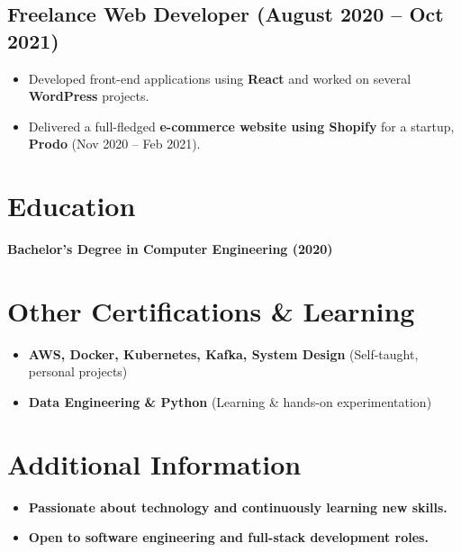 \documentclass[a4paper,11pt]{article}
\begin{document}
{\subsection*{Freelance Web Developer (August 2020 – Oct 2021)}
\begin{itemize}
    \item Developed front-end applications using \textbf{React} and worked on several \textbf{WordPress} projects.
    \item Delivered a full-fledged \textbf{e-commerce website using Shopify} for a startup, \textbf{Prodo} (Nov 2020 – Feb 2021).
\end{itemize}

\section*{{\faGraduationCap} Education}
\textbf{Bachelor's Degree in Computer Engineering (2020)}

\section*{{\faBook} Other Certifications \& Learning}
\begin{itemize}
    \item \textbf{AWS, Docker, Kubernetes, Kafka, System Design} (Self-taught, personal projects)
    \item \textbf{Data Engineering \& Python} (Learning \& hands-on experimentation)
\end{itemize}

\section*{{\faPlus} Additional Information}
\begin{itemize}
    \item \textbf{Passionate about technology and continuously learning new skills.}
    \item \textbf{Open to software engineering and full-stack development roles.}
\end{itemize}
}
\end{document}
